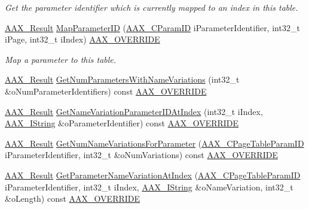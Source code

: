 \begin{DoxyCompactItemize}
\begin{DoxyCompactList}\small\item\em Get the parameter identifier which is currently mapped to an index in this table. \end{DoxyCompactList}\item 
\mbox{\hyperlink{a00392_a4d8f69a697df7f70c3a8e9b8ee130d2f}{A\+A\+X\+\_\+\+Result}} \mbox{\hyperlink{a01929_a533d37124e7a3823e43caed7fad821ed}{Map\+Parameter\+ID}} (\mbox{\hyperlink{a00392_a1440c756fe5cb158b78193b2fc1780d1}{A\+A\+X\+\_\+\+C\+Param\+ID}} i\+Parameter\+Identifier, int32\+\_\+t i\+Page, int32\+\_\+t i\+Index) \mbox{\hyperlink{a00392_ac2f24a5172689ae684344abdcce55463}{A\+A\+X\+\_\+\+O\+V\+E\+R\+R\+I\+DE}}
\begin{DoxyCompactList}\small\item\em Map a parameter to this table. \end{DoxyCompactList}\item 
\mbox{\hyperlink{a00392_a4d8f69a697df7f70c3a8e9b8ee130d2f}{A\+A\+X\+\_\+\+Result}} \mbox{\hyperlink{a01929_a01d73593f2c22f14791f13552ed43ace}{Get\+Num\+Parameters\+With\+Name\+Variations}} (int32\+\_\+t \&o\+Num\+Parameter\+Identifiers) const \mbox{\hyperlink{a00392_ac2f24a5172689ae684344abdcce55463}{A\+A\+X\+\_\+\+O\+V\+E\+R\+R\+I\+DE}}
\item 
\mbox{\hyperlink{a00392_a4d8f69a697df7f70c3a8e9b8ee130d2f}{A\+A\+X\+\_\+\+Result}} \mbox{\hyperlink{a01929_a3066b8c3ab0868c23831778b939fadd7}{Get\+Name\+Variation\+Parameter\+I\+D\+At\+Index}} (int32\+\_\+t i\+Index, \mbox{\hyperlink{a01873}{A\+A\+X\+\_\+\+I\+String}} \&o\+Parameter\+Identifier) const \mbox{\hyperlink{a00392_ac2f24a5172689ae684344abdcce55463}{A\+A\+X\+\_\+\+O\+V\+E\+R\+R\+I\+DE}}
\item 
\mbox{\hyperlink{a00392_a4d8f69a697df7f70c3a8e9b8ee130d2f}{A\+A\+X\+\_\+\+Result}} \mbox{\hyperlink{a01929_a07f92bc1f31bbab5156cac7ad0d35565}{Get\+Num\+Name\+Variations\+For\+Parameter}} (\mbox{\hyperlink{a00392_ab4e01b971dac1b25632fd9f710dd8f77}{A\+A\+X\+\_\+\+C\+Page\+Table\+Param\+ID}} i\+Parameter\+Identifier, int32\+\_\+t \&o\+Num\+Variations) const \mbox{\hyperlink{a00392_ac2f24a5172689ae684344abdcce55463}{A\+A\+X\+\_\+\+O\+V\+E\+R\+R\+I\+DE}}
\item 
\mbox{\hyperlink{a00392_a4d8f69a697df7f70c3a8e9b8ee130d2f}{A\+A\+X\+\_\+\+Result}} \mbox{\hyperlink{a01929_a0a009cc5bfa2e0424d6ed58087bd5962}{Get\+Parameter\+Name\+Variation\+At\+Index}} (\mbox{\hyperlink{a00392_ab4e01b971dac1b25632fd9f710dd8f77}{A\+A\+X\+\_\+\+C\+Page\+Table\+Param\+ID}} i\+Parameter\+Identifier, int32\+\_\+t i\+Index, \mbox{\hyperlink{a01873}{A\+A\+X\+\_\+\+I\+String}} \&o\+Name\+Variation, int32\+\_\+t \&o\+Length) const \mbox{\hyperlink{a00392_ac2f24a5172689ae684344abdcce55463}{A\+A\+X\+\_\+\+O\+V\+E\+R\+R\+I\+DE}}

\end{DoxyCompactItemize}
